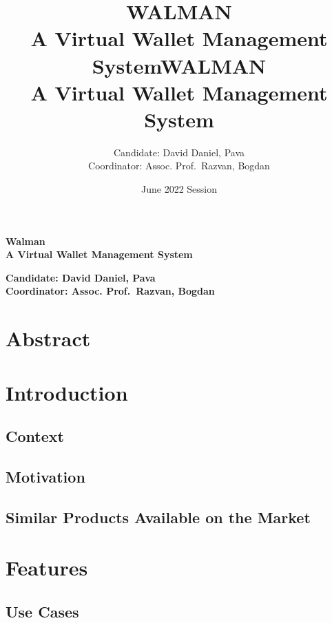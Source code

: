 \documentclass[a4paper,12pt]{report}
\title{\LARGE WALMAN\\{ A Virtual Wallet Management System}}
\title{\LARGE WALMAN\\{ A Virtual Wallet Management System}}
\author{Candidate: David Daniel, Pava
    \\Coordinator: Assoc. Prof.\ Razvan, Bogdan}
\date{June 2022 Session}
\begin{document}
\begin{titlepage}
    \thispagestyle{titlepage}
    \begin{center}
        \vspace*{10cm}
        \LARGE\textbf{Walman\\A Virtual Wallet Management System}\\
        \vfill
    \end{center}
    \begin{flushleft}
        \large\textbf{Candidate: David Daniel, Pava
            \\Coordinator: Assoc. Prof.\ Razvan, Bogdan}
    \end{flushleft}

\end{titlepage}

\chapter*{Abstract}

\tableofcontents

\chapter{Introduction}

\section{Context}

\section{Motivation}

\section{Similar Products Available on the Market}

\chapter{Features}

\section{Use Cases}
\end{document}
